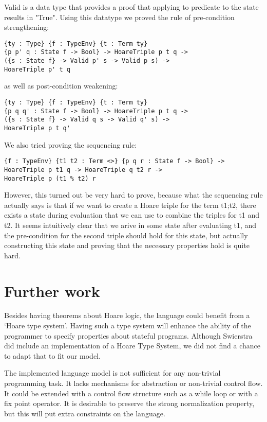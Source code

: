 \documentclass{article}
\begin{document}
Valid is a data type that provides a proof that applying to predicate to the state results in "True". Using this datatype we proved the rule of pre-condition strengthening:

\begin{lstlisting}
{ty : Type} {f : TypeEnv} {t : Term ty}
{p p' q : State f -> Bool} -> HoareTriple p t q ->
({s : State f} -> Valid p' s -> Valid p s) ->
HoareTriple p' t q
\end{lstlisting}

as well as post-condition weakening:

\begin{lstlisting}
{ty : Type} {f : TypeEnv} {t : Term ty}
{p q q' : State f -> Bool} -> HoareTriple p t q ->
({s : State f} -> Valid q s -> Valid q' s) ->
HoareTriple p t q'
\end{lstlisting}

We also tried proving the sequencing rule:

\begin{lstlisting}
{f : TypeEnv} {t1 t2 : Term <>} {p q r : State f -> Bool} ->
HoareTriple p t1 q -> HoareTriple q t2 r ->
HoareTriple p (t1 % t2) r
\end{lstlisting}

However, this turned out be very hard to prove, because what the sequencing rule actually says is that if we want to create a Hoare triple for the term t1;t2, there exists a state during evaluation that we can use to combine the triples for t1 and t2. It seems intuitively clear that we arive in some state after evaluating t1, and the pre-condition for the second triple should hold for this state, but actually constructing this state and proving that the necessary properties hold is quite hard.

\section{Further work}\label{sec:further}

Besides having theorems about Hoare logic, the language could benefit from a `Hoare type system'. Having such a type system will enhance the ability of the programmer to specify properties about stateful programs. Although Swierstra did include an implementation of a Hoare Type System, we did not find a chance to adapt that to fit our model.

The implemented language model is not sufficient for any non-trivial programming task. It lacks mechanisms for abstraction or non-trivial control flow. It could be extended with a control flow structure such as a while loop or with a fix point operator. It is desirable to preserve the strong normalization property, but this will put extra constraints on the language.
\end{document}
